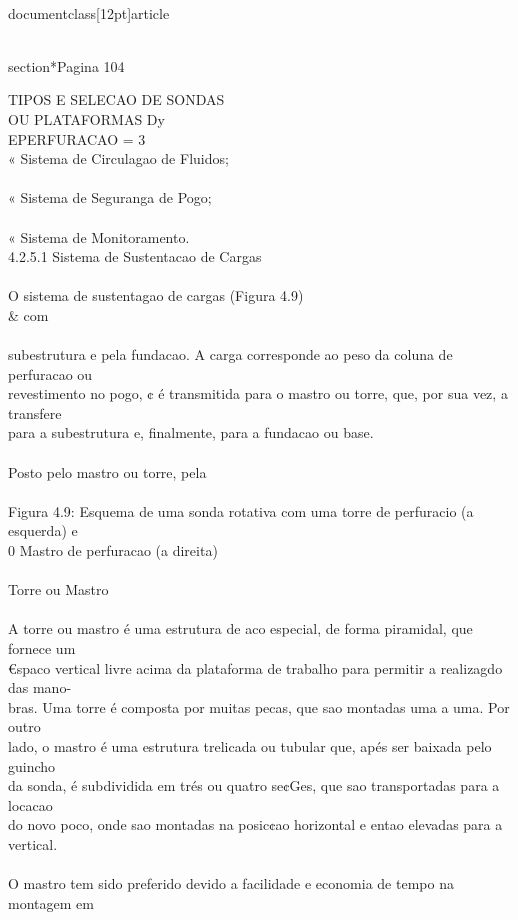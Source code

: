 \\documentclass[12pt]{article}
\begin{document}
\\section*{Pagina 104}

TIPOS E SELECAO DE SONDAS\\
OU PLATAFORMAS Dy\\
EPERFURACAO = 3\\
« Sistema de Circulagao de Fluidos;\\
\\
« Sistema de Seguranga de Pogo;\\
\\
« Sistema de Monitoramento.\\
4.2.5.1 Sistema de Sustentacao de Cargas\\
\\
O sistema de sustentagao de cargas (Figura 4.9) \\& com\\
\\
subestrutura e pela fundacao. A carga corresponde ao peso da coluna de perfuracao ou\\
revestimento no pogo, ¢ é transmitida para o mastro ou torre, que, por sua vez, a transfere\\
para a subestrutura e, finalmente, para a fundacao ou base.\\
\\
Posto pelo mastro ou torre, pela\\
\\
Figura 4.9: Esquema de uma sonda rotativa com uma torre de perfuracio (a esquerda) e\\
0 Mastro de perfuracao (a direita)\\
\\
Torre ou Mastro\\
\\
A torre ou mastro é uma estrutura de aco especial, de forma piramidal, que fornece um\\
€spaco vertical livre acima da plataforma de trabalho para permitir a realizagdo das mano-\\
bras. Uma torre é composta por muitas pecas, que sao montadas uma a uma. Por outro\\
lado, o mastro é uma estrutura trelicada ou tubular que, apés ser baixada pelo guincho\\
da sonda, é subdividida em trés ou quatro se¢Ges, que sao transportadas para a locacao\\
do novo poco, onde sao montadas na posic¢ao horizontal e entao elevadas para a vertical.\\
\\
O mastro tem sido preferido devido a facilidade e economia de tempo na montagem em\\
\end{document}
